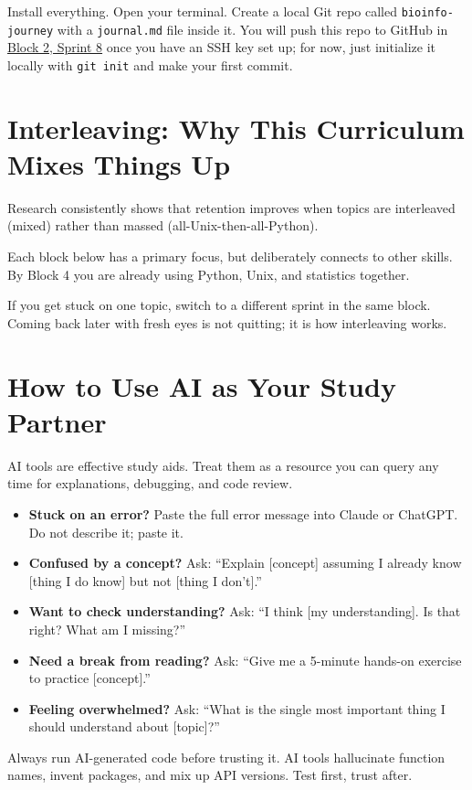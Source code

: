 \begin{winbox}
Install everything. Open your terminal. Create a local Git repo called \texttt{bioinfo-journey} with a \texttt{journal.md} file inside it. You will push this repo to GitHub in \hyperref[chap:unix]{Block 2, Sprint 8} once you have an SSH key set up; for now, just initialize it locally with \texttt{git init} and make your first commit.
\end{winbox}


\section{Interleaving: Why This Curriculum Mixes Things Up}

\begin{brainbox}
Research consistently shows that retention improves when topics are interleaved (mixed) rather than massed (all-Unix-then-all-Python).

Each block below has a primary focus, but deliberately connects to other skills. By Block 4 you are already using Python, Unix, and statistics together.

If you get stuck on one topic, switch to a different sprint in the same block. Coming back later with fresh eyes is not quitting; it is how interleaving works.
\end{brainbox}


\section{How to Use AI as Your Study Partner}

AI tools are effective study aids. Treat them as a resource you can query any time for explanations, debugging, and code review.

\begin{itemize}[nosep]
  \item \textbf{Stuck on an error?} Paste the full error message into Claude or ChatGPT. Do not describe it; paste it.
  \item \textbf{Confused by a concept?} Ask: ``Explain [concept] assuming I already know [thing I do know] but not [thing I don't].''
  \item \textbf{Want to check understanding?} Ask: ``I think [my understanding]. Is that right? What am I missing?''
  \item \textbf{Need a break from reading?} Ask: ``Give me a 5-minute hands-on exercise to practice [concept].''
  \item \textbf{Feeling overwhelmed?} Ask: ``What is the single most important thing I should understand about [topic]?''
\end{itemize}

\begin{warnbox}
Always run AI-generated code before trusting it. AI tools hallucinate function names, invent packages, and mix up API versions. Test first, trust after.
\end{warnbox}
